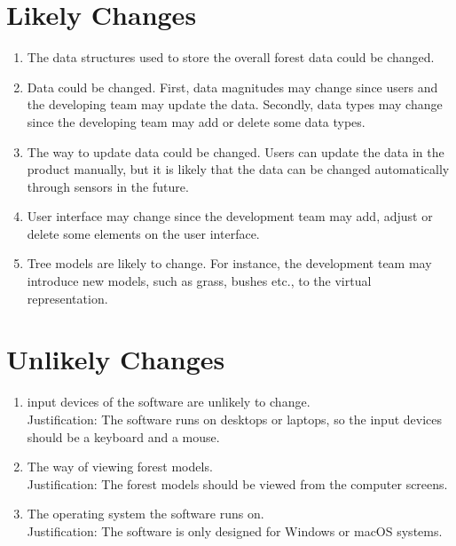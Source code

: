 \documentclass{article}
\begin{document}
\section{Likely Changes}
\begin{enumerate}
\item The data structures used to store the overall forest data could be changed.
\item Data could be changed. First, data magnitudes may change since users and the developing team
may update the data. Secondly, data types may change since the developing team may add or 
delete some data types.
\item The way to update data could be changed. Users can update the data in the product manually, but it is likely that the data can be changed automatically through sensors in the future.  
\item User interface may change since the development team may add, adjust or delete some elements on the user interface. 
\item Tree models are likely to change. For instance, the development team may introduce new models, such as grass, bushes etc., to the virtual representation.
\end{enumerate}

\section{Unlikely Changes}
\begin{enumerate}
\item input devices of the software are unlikely to change.\\
Justification: The software runs on desktops or laptops, so the input devices should be a keyboard and a mouse.
\item The way of viewing forest models.\\
Justification: The forest models should be viewed from the computer screens.
\item The operating system the software runs on.\\
Justification: The software is only designed for Windows or macOS systems.\\
\end{enumerate}

\newpage

\appendix
\end{document}
